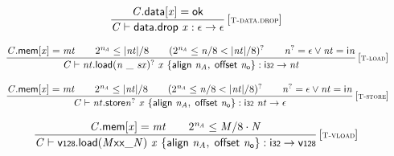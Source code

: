 $$
\begin{array}{@{}c@{}}\displaystyle
\frac{
{\mathit{C}}.\mathsf{data}[{\mathit{x}}] = \mathsf{ok}
}{
{\mathit{C}} \vdash \mathsf{data.drop}~{\mathit{x}} : \epsilon \rightarrow \epsilon
} \, {[\textsc{\scriptsize T{-}data.drop}]}
\qquad
\end{array}
$$

$$
\begin{array}{@{}c@{}}\displaystyle
\frac{
{\mathit{C}}.\mathsf{mem}[{\mathit{x}}] = {\mathit{mt}}
 \qquad
{2^{{\mathit{n}}_{{\mathit{A}}}}} \leq {|{\mathit{nt}}|} / 8
 \qquad
({2^{{\mathit{n}}_{{\mathit{A}}}}} \leq {\mathit{n}} / 8 < {|{\mathit{nt}}|} / 8)^?
 \qquad
{{\mathit{n}}^?} = \epsilon \lor {\mathit{nt}} = {\mathsf{i}}{{\mathit{n}}}
}{
{\mathit{C}} \vdash {{\mathit{nt}}.\mathsf{load}}{{({\mathit{n}}~\mathsf{\_}~{\mathit{sx}})^?}}~{\mathit{x}}~\{ \begin{array}[t]{@{}l@{}}
\mathsf{align}~{\mathit{n}}_{{\mathit{A}}},\; \mathsf{offset}~{\mathit{n}}_{{\mathsf{o}}} \}\end{array} : \mathsf{i{\scriptstyle32}} \rightarrow {\mathit{nt}}
} \, {[\textsc{\scriptsize T{-}load}]}
\qquad
\end{array}
$$

$$
\begin{array}{@{}c@{}}\displaystyle
\frac{
{\mathit{C}}.\mathsf{mem}[{\mathit{x}}] = {\mathit{mt}}
 \qquad
{2^{{\mathit{n}}_{{\mathit{A}}}}} \leq {|{\mathit{nt}}|} / 8
 \qquad
({2^{{\mathit{n}}_{{\mathit{A}}}}} \leq {\mathit{n}} / 8 < {|{\mathit{nt}}|} / 8)^?
 \qquad
{{\mathit{n}}^?} = \epsilon \lor {\mathit{nt}} = {\mathsf{i}}{{\mathit{n}}}
}{
{\mathit{C}} \vdash {{\mathit{nt}}.\mathsf{store}}{{{\mathit{n}}^?}}~{\mathit{x}}~\{ \begin{array}[t]{@{}l@{}}
\mathsf{align}~{\mathit{n}}_{{\mathit{A}}},\; \mathsf{offset}~{\mathit{n}}_{{\mathsf{o}}} \}\end{array} : \mathsf{i{\scriptstyle32}}~{\mathit{nt}} \rightarrow \epsilon
} \, {[\textsc{\scriptsize T{-}store}]}
\qquad
\end{array}
$$

$$
\begin{array}{@{}c@{}}\displaystyle
\frac{
{\mathit{C}}.\mathsf{mem}[{\mathit{x}}] = {\mathit{mt}}
 \qquad
{2^{{\mathit{n}}_{{\mathit{A}}}}} \leq {\mathit{M}} / 8 \cdot {\mathit{N}}
}{
{\mathit{C}} \vdash {\mathsf{v{\scriptstyle128}.load}}{({{{{{\mathit{M}}}{\mathsf{x}}}{\mathsf{x}}}{\mathsf{\_}}}{{\mathit{N}}})}~{\mathit{x}}~\{ \begin{array}[t]{@{}l@{}}
\mathsf{align}~{\mathit{n}}_{{\mathit{A}}},\; \mathsf{offset}~{\mathit{n}}_{{\mathsf{o}}} \}\end{array} : \mathsf{i{\scriptstyle32}} \rightarrow \mathsf{v{\scriptstyle128}}
} \, {[\textsc{\scriptsize T{-}vload}]}
\qquad
\end{array}
$$


